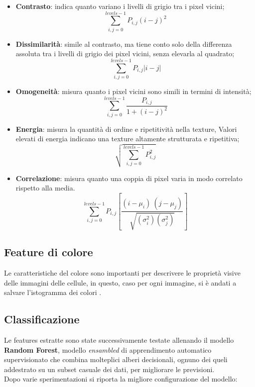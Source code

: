\documentclass[italian,10pt,a4paper]{article}
\begin{document}
					\begin{itemize}
						
						\item \textbf{Contrasto}: indica quanto variano i livelli di grigio tra i pixel vicini; $$\sum_{i,j=0}^{levels-1} P_{i,j}(i-j)^2$$
						
						\item \textbf{Dissimilarità}: simile al contrasto, ma tiene conto solo della differenza assoluta tra i livelli di grigio dei pixel vicini, senza elevarla al quadrato; $$\sum_{i,j=0}^{levels-1}P_{i,j}|i-j|$$
						
						\item \textbf{Omogeneità}: misura quanto i pixel vicini sono simili in termini di intensità; $$\sum_{i,j=0}^{levels-1}\frac{P_{i,j}}{1+(i-j)^2}$$
						
						\item \textbf{Energia}: misura la quantità di ordine e ripetitività nella texture, Valori elevati di energia indicano una texture altamente strutturata e ripetitiva; $$\sqrt{\sum_{i,j=0}^{levels-1} P_{i,j}^2}$$
						
						\item \textbf{Correlazione}: misura quanto una coppia di pixel varia in modo correlato rispetto alla media. $$\sum_{i,j=0}^{levels-1} P_{i,j}\left[\frac{(i-\mu_i) \
							(j-\mu_j)}{\sqrt{(\sigma_i^2)(\sigma_j^2)}}\right]$$
						
					\end{itemize}
					
				\subsection{Feature di colore}
					Le caratteristiche del colore sono importanti per descrivere le proprietà visive delle immagini delle cellule, in questo, caso per ogni immagine, si è andati a salvare l'istogramma dei colori \cite{Baker_2021}.
				 			
		\subsection{Classificazione}
		
			Le features estratte sono state successivamente testate allenando il modello \textbf{Random Forest}, modello \textit{ensambled} di apprendimento automatico supervisionato che combina molteplici alberi decisionali, ognuno dei queli addestrato su un subset casuale dei dati, per migliorare le previsioni.\\ 
			\linebreak
			Dopo varie sperimentazioni si riporta la migliore configurazione del modello:
			
\end{document}
